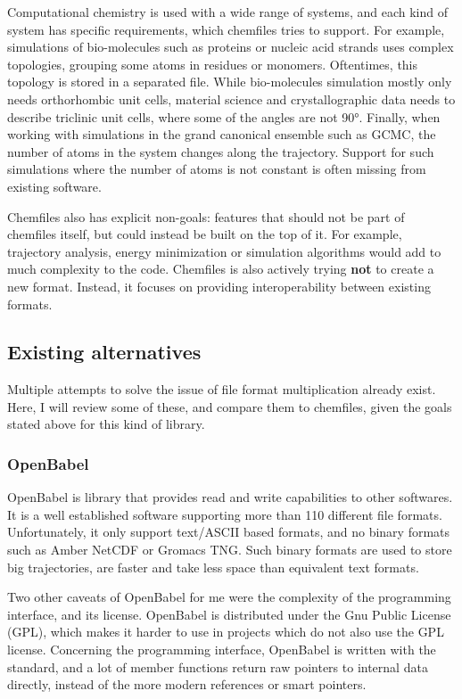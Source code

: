 \documentclass[thesis]{subfiles}
\begin{document}
Computational chemistry is used with a wide range of systems, and each kind of
system has specific requirements, which chemfiles tries to support. For
example, simulations of bio-molecules such as proteins or nucleic acid strands
uses complex topologies, grouping some atoms in residues or monomers.
Oftentimes, this topology is stored in a separated file. While bio-molecules
simulation mostly only needs orthorhombic unit cells, material science and
crystallographic data needs to describe triclinic unit cells, where some of the
angles are not 90°. Finally, when working with simulations in the grand
canonical ensemble such as GCMC, the number of atoms in the system changes along
the trajectory. Support for such simulations where the number of atoms is not
constant is often missing from existing software.

Chemfiles also has explicit non-goals: features that should not be part of
chemfiles itself, but could instead be built on the top of it. For example,
trajectory analysis, energy minimization or simulation algorithms would add to
much complexity to the code. Chemfiles is also actively trying \textbf{not} to
create a new format. Instead, it focuses on providing interoperability between
existing formats.

\subsection{Existing alternatives}

Multiple attempts to solve the issue of file format multiplication already
exist. Here, I will review some of these, and compare them to chemfiles,
given the goals stated above for this kind of library.

\subsubsection{OpenBabel}

OpenBabel\cite{OBoyle2011} is \cxx library that provides read and write
capabilities to other softwares. It is a well established software supporting
more than 110 different file formats. Unfortunately, it only support text/ASCII
based formats, and no binary formats such as Amber NetCDF or Gromacs TNG. Such
binary formats are used to store big trajectories, are faster and take less
space than equivalent text formats.

Two other caveats of OpenBabel for me were the complexity of the programming
interface, and its license. OpenBabel is distributed under the Gnu Public
License (GPL), which makes it harder to use in projects which do not also use
the GPL license. Concerning the programming interface, OpenBabel is written with
the  standard, and a lot of member functions return raw pointers to
internal data directly, instead of the more modern references or smart pointers.
\end{document}
